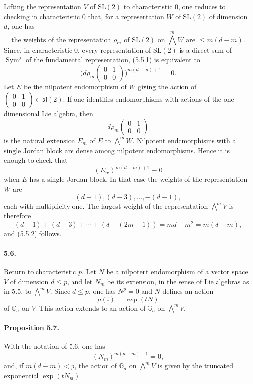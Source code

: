 \documentclass[11pt]{article}
\newcommand{\Ga}{\mathbb{G}_a}
\newcommand{\Sym}{\operatorname{Sym}}
\theoremstyle{plain}
\theoremstyle{definition}
\begin{document}
Lifting the representation $V$ of $\mathrm{SL}(2)$ to characteristic $0$, one reduces to checking in characteristic $0$ that, for a representation $W$ of $\mathrm{SL}(2)$ of dimension $d$, one has
\begin{equation}\tag{5.5.1}
   \text{the weights of the representation }\rho_m\text{ of }\mathrm{SL}(2)\text{ on }\bigwedge^m W\text{ are }\le m(d-m).
\end{equation}
Since, in characteristic $0$, every representation of $\mathrm{SL}(2)$ is a direct sum of $\Sym^j$ of the fundamental representation, (5.5.1) is equivalent to
\begin{equation}\tag{5.5.2}
   \bigl(d\rho_m\begin{pmatrix}0&1\\0&0\end{pmatrix}\bigr)^{m(d-m)+1}=0.
\end{equation}
Let $E$ be the nilpotent endomorphism of $W$ giving the action of $\begin{pmatrix}0&1\\0&0\end{pmatrix}\in\mathfrak{sl}(2)$. If one identifies endomorphisms with actions of the one-dimensional Lie algebra, then
\[
   d\rho_m\begin{pmatrix}0&1\\0&0\end{pmatrix}
\]
is the natural extension $E_m$ of $E$ to $\bigwedge^m W$. Nilpotent endomorphisms with a single Jordan block are dense among nilpotent endomorphisms. Hence it is enough to check that
\[
   (E_m)^{m(d-m)+1}=0
\]
when $E$ has a single Jordan block. In that case the weights of the representation $W$ are
\[
   (d-1),(d-3),\ldots,-(d-1),
\]
each with multiplicity one. The largest weight of the representation $\bigwedge^m V$ is therefore
\[
   (d-1)+(d-3)+\cdots+(d-(2m-1))=md-m^2=m(d-m),
\]
and (5.5.2) follows.

\paragraph{5.6.} Return to characteristic $p$. Let $N$ be a nilpotent endomorphism of a vector space $V$ of dimension $d\le p$, and let $N_m$ be its extension, in the sense of Lie algebras as in 5.5, to $\bigwedge^m V$. Since $d\le p$, one has $N^p=0$ and $N$ defines an action
\[
   \rho(t)=\exp(tN)
\]
of $\Ga$ on $V$. This action extends to an action of $\Ga$ on $\bigwedge^m V$.

\paragraph{Proposition 5.7.} With the notation of 5.6, one has
\begin{equation}\tag{5.7.1}
   (N_m)^{m(d-m)+1}=0,
\end{equation}
and, if $m(d-m)<p$, the action of $\Ga$ on $\bigwedge^m V$ is given by the truncated exponential $\exp(tN_m)$.
\end{document}
